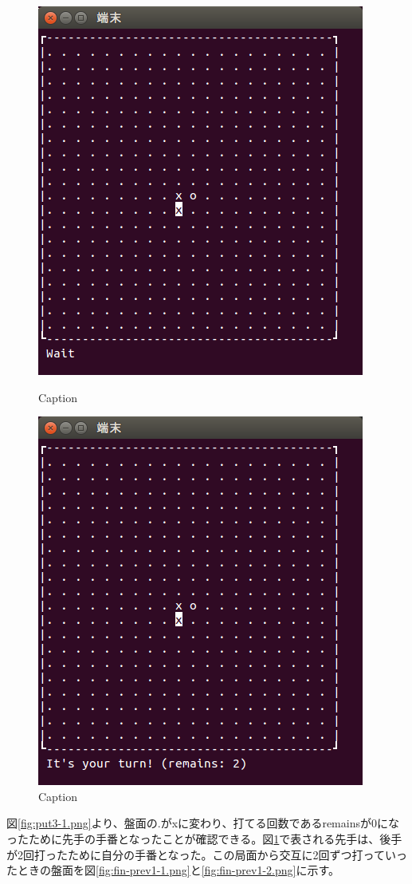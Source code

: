 \documentclass[a4j, titlepage, 10pt]{jsarticle}
\begin{document}
\begin{figure}[H]
  \begin{minipage}{0.5\hsize}
    \centering
    \includegraphics[scale=0.5]{img/put3-1.png}
    \caption{Caption}
    \label{fig:put3-1.png}
  \end{minipage}
  \begin{minipage}{0.5\hsize}
    \includegraphics[scale=0.5]{img/put3-2.png}
    \caption{Caption}
    \label{fig:put3-2.png}
  \end{minipage}
\end{figure}
図\ref{fig:put3-1.png}より、盤面の{\ttfamily .}が{\ttfamily x}に変わり、打てる回数である{\ttfamily remains}が0になったために先手の手番となったことが確認できる。図\ref{fig:put3-2.png}で表される先手は、後手が2回打ったために自分の手番となった。この局面から交互に2回ずつ打っていったときの盤面を図\ref{fig:fin-prev1-1.png}と\ref{fig:fin-prev1-2.png}に示す。
\end{document}

